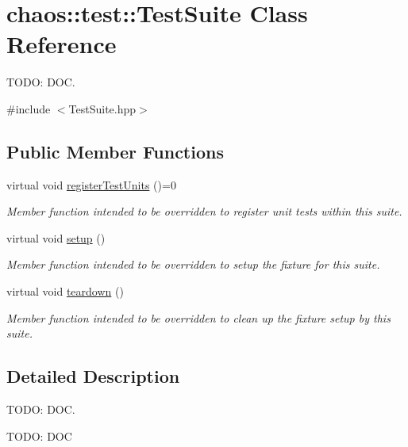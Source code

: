 \hypertarget{classchaos_1_1test_1_1_test_suite}{\section{chaos\-:\-:test\-:\-:Test\-Suite Class Reference}
\label{classchaos_1_1test_1_1_test_suite}
}


T\-O\-D\-O\-: D\-O\-C.  




{\ttfamily \#include $<$Test\-Suite.\-hpp$>$}

\subsection*{Public Member Functions}
\begin{DoxyCompactItemize}
\item 
virtual void \hyperlink{classchaos_1_1test_1_1_test_suite_a3d9c8c7f0ff3f7b1f74717abc747b3fd}{register\-Test\-Units} ()=0
\begin{DoxyCompactList}\small\item\em Member function intended to be overridden to register unit tests within this suite. \end{DoxyCompactList}\item 
virtual void \hyperlink{classchaos_1_1test_1_1_test_suite_ad0a1e7224769042c7ef55c1cd6192982}{setup} ()
\begin{DoxyCompactList}\small\item\em Member function intended to be overridden to setup the fixture for this suite. \end{DoxyCompactList}\item 
virtual void \hyperlink{classchaos_1_1test_1_1_test_suite_a6ff5bccbbc0f6590f9c921734ed40029}{teardown} ()
\begin{DoxyCompactList}\small\item\em Member function intended to be overridden to clean up the fixture setup by this suite. \end{DoxyCompactList}\end{DoxyCompactItemize}


\subsection{Detailed Description}
T\-O\-D\-O\-: D\-O\-C. 

T\-O\-D\-O\-: D\-O\-C 

